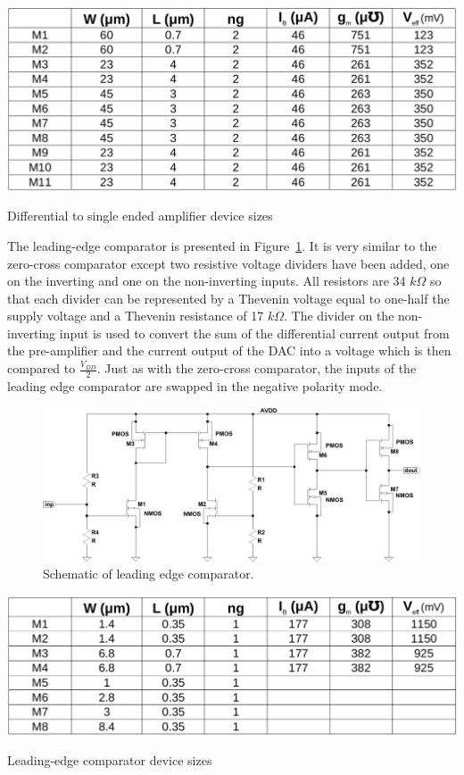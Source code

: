 \documentclass[12pt,oneside,final]{siuethesis}
\theoremstyle{definition}
\begin{document}
\begin{table}[htbp!]
 \centering
 \includegraphics[scale=.35,keepaspectratio=true]{./ch3_figures/d2s_sizes.png}
 \caption{Differential to single ended amplifier device sizes}
 \label{tab:d2s-sizes}
\end{table}

\par The leading-edge comparator is presented in Figure~\ref{FIG:LE_CMP}. It is very similar to the zero-cross comparator except two resistive voltage dividers have been added, one on the inverting and one on the non-inverting inputs.  All resistors are 34 $k \Omega$ so that each divider can be represented by a Thevenin voltage equal to one-half the supply voltage and a Thevenin resistance of 17 $k \Omega$.  The divider on the non-inverting input is used to convert the sum of the differential current output from the pre-amplifier and the current output of the DAC into a voltage which is then compared to $\frac{V_{DD}}{2}$. Just as with the zero-cross comparator, the inputs of the leading edge comparator are swapped in the negative polarity mode.

\begin{figure}[htbp!]
	\centering
 	\includegraphics[scale=0.55,keepaspectratio=true]{../Design_Reports/CFD_circuit_report/images/le_cmp.pdf}
 	\caption{Schematic of leading edge comparator.}
 	\label{FIG:LE_CMP}
\end{figure}

\begin{table}[htbp!]
 \centering
 \includegraphics[scale=.35,keepaspectratio=true]{./ch3_figures/le_cmp_sizes.png}
 \caption{Leading-edge comparator device sizes}
 \label{tab:le-comp-sizes}
\end{table}
\end{document}
